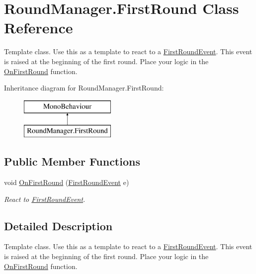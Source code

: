 \hypertarget{class_round_manager_1_1_first_round}{}\section{Round\+Manager.\+First\+Round Class Reference}
\label{class_round_manager_1_1_first_round}


Template class. Use this as a template to react to a \hyperlink{class_round_manager_1_1_events_1_1_first_round_event}{First\+Round\+Event}. This event is raised at the beginning of the first round. Place your logic in the \hyperlink{class_round_manager_1_1_first_round_a1e871f066611f93a4cb08b168d22185e}{On\+First\+Round} function.  


Inheritance diagram for Round\+Manager.\+First\+Round\+:\begin{figure}[H]
\begin{center}
\leavevmode
\includegraphics[height=2.000000cm]{class_round_manager_1_1_first_round}
\end{center}
\end{figure}
\subsection*{Public Member Functions}
\begin{DoxyCompactItemize}
\item 
void \hyperlink{class_round_manager_1_1_first_round_a1e871f066611f93a4cb08b168d22185e}{On\+First\+Round} (\hyperlink{class_round_manager_1_1_events_1_1_first_round_event}{First\+Round\+Event} e)
\begin{DoxyCompactList}\small\item\em React to \hyperlink{class_round_manager_1_1_events_1_1_first_round_event}{First\+Round\+Event}. \end{DoxyCompactList}\end{DoxyCompactItemize}


\subsection{Detailed Description}
Template class. Use this as a template to react to a \hyperlink{class_round_manager_1_1_events_1_1_first_round_event}{First\+Round\+Event}. This event is raised at the beginning of the first round. Place your logic in the \hyperlink{class_round_manager_1_1_first_round_a1e871f066611f93a4cb08b168d22185e}{On\+First\+Round} function. 



